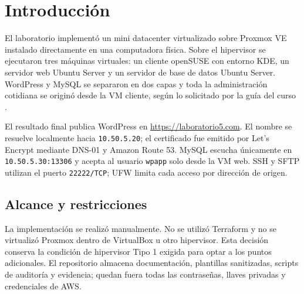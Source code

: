\section{Introducción}

El laboratorio implementó un mini datacenter virtualizado sobre Proxmox VE instalado directamente en una computadora física. Sobre el hipervisor se ejecutaron tres máquinas virtuales: un cliente openSUSE con entorno KDE, un servidor web Ubuntu Server y un servidor de base de datos Ubuntu Server. WordPress y MySQL se separaron en dos capas y toda la administración cotidiana se originó desde la VM cliente, según lo solicitado por la guía del curso \cite{guia-lab5}.

El resultado final publica WordPress en \url{https://laboratorio5.com}. El nombre se resuelve localmente hacia \texttt{10.50.5.20}; el certificado fue emitido por Let's Encrypt mediante DNS-01 y Amazon Route 53. MySQL escucha únicamente en \texttt{10.50.5.30:13306} y acepta al usuario \texttt{wpapp} solo desde la VM web. SSH y SFTP utilizan el puerto \texttt{22222/TCP}; UFW limita cada acceso por dirección de origen.


\subsection{Alcance y restricciones}

La implementación se realizó manualmente. No se utilizó Terraform y no se virtualizó Proxmox dentro de VirtualBox u otro hipervisor. Esta decisión conserva la condición de hipervisor Tipo 1 exigida para optar a los puntos adicionales. El repositorio almacena documentación, plantillas sanitizadas, scripts de auditoría y evidencia; quedan fuera todas las contraseñas, llaves privadas y credenciales de AWS.
